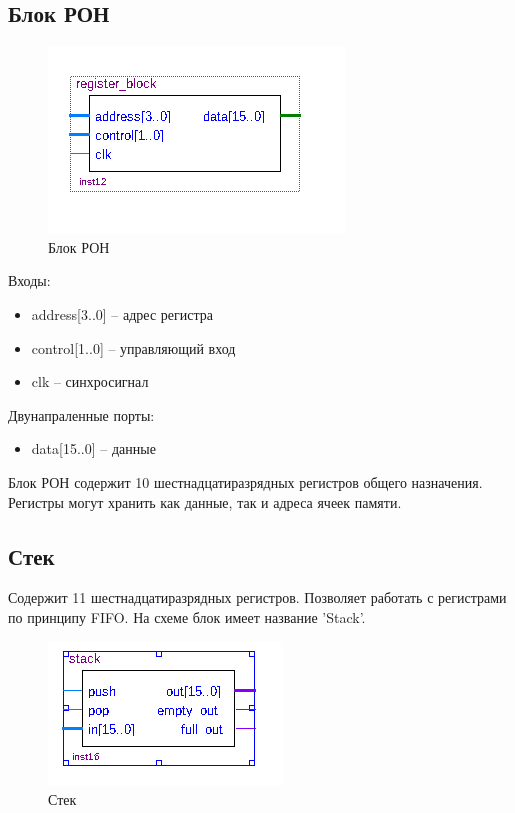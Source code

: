 \subsection{Блок РОН}
\begin{figure}[ht]
\centering
    \includegraphics[scale=0.8]{regb}
    \caption{Блок РОН}
\end{figure}

Входы:
\begin{itemize}
    \item address[3..0] -- адрес регистра
    \item control[1..0] -- управляющий вход
    \item clk -- синхросигнал
\end{itemize}
Двунапраленные порты:
\begin{itemize}
    \item data[15..0] -- данные
\end{itemize}

Блок РОН содержит 10 шестнадцатиразрядных регистров общего назначения. Регистры могут хранить как данные, так и адреса ячеек памяти.

\subsection{Стек}
Содержит 11 шестнадцатиразрядных регистров. Позволяет работать с регистрами по принципу FIFO. На схеме блок имеет название 'Stack'.

\begin{figure}[ht]
\centering
    \includegraphics[scale=0.8]{stackb}
    \caption{Стек}
\end{figure}

